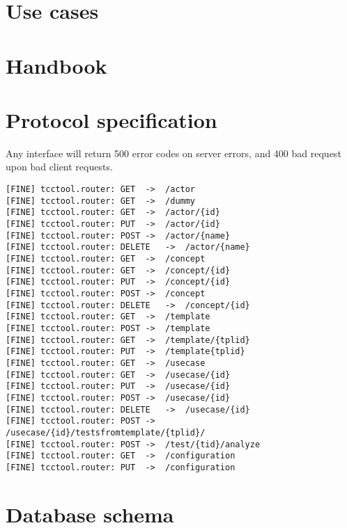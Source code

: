 \chapter{Use cases}




\chapter{Handbook}
\chapter{Protocol specification}
Any interface will return 500 error codes on server errors, and 400 bad request upon bad client requests.
\begin{verbatim}
[FINE] tcctool.router: GET	->	/actor
[FINE] tcctool.router: GET	->	/dummy
[FINE] tcctool.router: GET	->	/actor/{id}
[FINE] tcctool.router: PUT	->	/actor/{id}
[FINE] tcctool.router: POST	->	/actor/{name}
[FINE] tcctool.router: DELETE	->	/actor/{name}
[FINE] tcctool.router: GET	->	/concept
[FINE] tcctool.router: GET	->	/concept/{id}
[FINE] tcctool.router: PUT	->	/concept/{id}
[FINE] tcctool.router: POST	->	/concept
[FINE] tcctool.router: DELETE	->	/concept/{id}
[FINE] tcctool.router: GET	->	/template
[FINE] tcctool.router: POST	->	/template
[FINE] tcctool.router: GET	->	/template/{tplid}
[FINE] tcctool.router: PUT	->	/template{tplid}
[FINE] tcctool.router: GET	->	/usecase
[FINE] tcctool.router: GET	->	/usecase/{id}
[FINE] tcctool.router: PUT	->	/usecase/{id}
[FINE] tcctool.router: POST	->	/usecase/{id}
[FINE] tcctool.router: DELETE	->	/usecase/{id}
[FINE] tcctool.router: POST	->	/usecase/{id}/testsfromtemplate/{tplid}/
[FINE] tcctool.router: POST	->	/test/{tid}/analyze
[FINE] tcctool.router: GET	->	/configuration
[FINE] tcctool.router: PUT	->	/configuration
\end{verbatim}

\chapter{Database schema}
